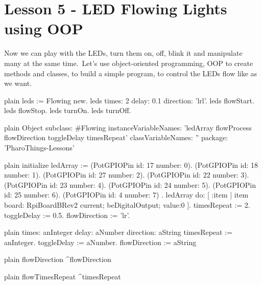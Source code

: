 \documentclass[10pt,twoside,english]{_support/latex/sbabook/sbabook}
\begin{document}
\frontmatter
\pagestyle{plain}

\tableofcontents*
\clearpage\listoffigures

\mainmatter

\chapter{Lesson 5 - LED Flowing Lights using OOP}
Now we can play with the LEDs, turn them on, off, blink it and manipulate many at the same time. Let’s use object-oriented programming, OOP to create methods and classes, to build a simple program, to control the LEDs flow like as we want.

\begin{displaycode}{plain}
leds := Flowing new.
leds times: 2 delay: 0.1 direction: 'lrl'.
leds flowStart.
leds flowStop.
leds turnOn.
leds turnOff.
\end{displaycode}

\begin{displaycode}{plain}
Object subclass: #Flowing
	instanceVariableNames: 'ledArray flowProcess flowDirection toggleDelay timesRepeat'
	classVariableNames: ''
	package: 'PharoThings-Lessons'
\end{displaycode}

\begin{displaycode}{plain}
initialize
	ledArray := { 
	(PotGPIOPin id: 17 number: 0).
	(PotGPIOPin id: 18 number: 1).
	(PotGPIOPin id: 27 number: 2).
	(PotGPIOPin id: 22 number: 3).
	(PotGPIOPin id: 23 number: 4).
	(PotGPIOPin id: 24 number: 5).
	(PotGPIOPin id: 25 number: 6).
	(PotGPIOPin id: 4 number: 7)
	}.
   ledArray do: [ :item | item board: RpiBoardBRev2 current; beDigitalOutput; value:0 ].
	timesRepeat := 2.
	toggleDelay := 0.5.
	flowDirection := 'lr'.
\end{displaycode}

\begin{displaycode}{plain}
times: anInteger delay: aNumber direction: aString
	timesRepeat := anInteger.
	toggleDelay := aNumber.
	flowDirection := aString
\end{displaycode}

\begin{displaycode}{plain}
flowDirection
	^flowDirection
\end{displaycode}

\begin{displaycode}{plain}
flowTimesRepeat
	^timesRepeat
\end{displaycode}
\end{document}
